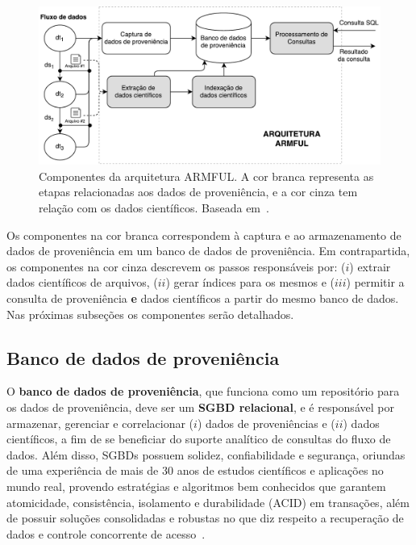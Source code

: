 \begin{figure}[ht]
    \centering
    \includegraphics[width=\textwidth]{img/armful-architecture-simplified}
    \caption[Componentes da arquitetura ARMFUL]{Componentes da arquitetura ARMFUL. A cor branca representa as etapas relacionadas aos dados de proveniência, e a cor cinza tem relação com os dados científicos. Baseada em~\cite{silva2017raw}.}%
    \label{fig:armful-architecture-simplified}
\end{figure}

Os componentes na cor branca correspondem à captura e ao armazenamento de dados de proveniência em um banco de dados de proveniência. Em contrapartida, os componentes na cor cinza descrevem os passos responsáveis por: (\(i\)) extrair dados científicos de arquivos, (\(ii\)) gerar índices para os mesmos e (\(iii\)) permitir a consulta de proveniência \textbf{e} dados científicos a partir do mesmo banco de dados. Nas próximas subseções os componentes serão detalhados.

\subsection{Banco de dados de proveniência}%
\label{subsec:banco-de-dados-de-proveniencia}

O \textbf{banco de dados de proveniência}, que funciona como um repositório para os dados de proveniência, deve ser um \textbf{SGBD relacional}, e é responsável por armazenar, gerenciar e correlacionar (\(i\)) dados de proveniências e (\(ii\)) dados científicos, a fim de se beneficiar do suporte analítico de consultas do fluxo de dados. Além disso, SGBDs possuem solidez, confiabilidade e segurança, oriundas de uma experiência de mais de 30 anos de estudos científicos e aplicações no mundo real, provendo estratégias e algoritmos bem conhecidos que garantem atomicidade, consistência, isolamento e durabilidade (ACID) em transações, além de possuir soluções consolidadas e robustas no que diz respeito a recuperação de dados e controle concorrente de acesso~\cite{ozsu2011principles}.

